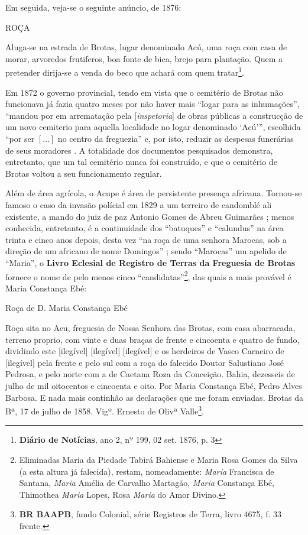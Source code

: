 Em seguida, veja-se o seguinte anúncio, de 1876:

\begin{citacao}
ROÇA

Aluga-se na estrada de Brotas, lugar denominado Acú, uma roça com casa de morar, arvoredos frutiferos, boa fonte de bica, brejo para plantação. Quem a pretender dirija-se a venda do beco que achará com quem tratar\footnote{\textbf{Diário de Notícias}, ano 2, nº 199, 02 set. 1876, p. 3}.
\end{citacao}

Em 1872 o governo provincial, tendo em vista que o cemitério de Brotas não funcionava já fazia quatro meses por não haver mais ``logar para as inhumações'', ``mandou por em arrematação pela [\textit{inspetoria}] de obras públicas a construcção de um novo cemiterio para aquella localidade no logar denominado `Acú''', escolhida ``por ser \([\dots]\) no centro da freguezia'' e, por isto, reduzir as despesas funerárias de seus moradores \cite[p.~12]{bahia_1872}. A totalidade dos documentos pesquisados demonstra, entretanto, que um tal cemitério nunca foi construído, e que o cemitério de Brotas voltou a seu funcionamento regular.

Além de área agrícola, o Acupe é área de persistente presença africana. Tornou-se famoso o caso da invasão polícial em 1829 a um terreiro de candomblé ali existente, a mando do juiz de paz Antonio Gomes de Abreu Guimarães \cite[pp.~32-61]{REISSILVA1989}; menos conhecida, entretanto, é a continuidade dos ``batuques'' e ``calundus'' na área trinta e cinco anos depois, desta vez ``na roça de uma senhora Marocas, sob a direção de um africano de nome Domingos'' \cite[p.~137]{reis_domingos_2008}; sendo ``Marocas'' um apelido de ``Maria'', o \textbf{Livro Eclesial de Registro de Terras da Freguesia de Brotas} fornece o nome de pelo menos cinco ``candidatas''\footnote{Eliminadas Maria da Piedade Tabirá Bahiense e Maria Rosa Gomes da Silva (a esta altura já falecida), restam, nomeadamente: \textit{Maria} Francisca de Santana, \textit{Maria} Amélia de Carvalho Martagão, \textit{Maria} Constança Ebé, Thimothea \textit{Maria} Lopes, Rosa \textit{Maria} do Amor Divino.}, das quais a mais provável é Maria Constança Ebé:

\begin{citacao}
Roça de D. Maria Constança Ebé

Roça sita no Acu, freguesia de Nossa Senhora das Brotas, com casa abarracada, terreno proprio, com vinte e duas braças de frente e cincoenta e quatro de fundo, dividindo este [ilegível] [ilegível] [ilegível] e os herdeiros de Vasco Carneiro de [ilegível] pela frente e pelo sul com a roça do falecido Doutor Salustiano José Pedrosa, e pelo norte com a de Caetana Roza da Conceição. Bahia, dezesseis de julho de mil oitocentos e cincoenta e oito. Por Maria Constança Ebé, Pedro Alves Barbosa. E nada mais continhão as declarações que me foram enviadas. Brotas da Bª, 17 de julho de 1858. Vigº. Ernesto de Olivª Valle\footnote{\textbf{BR BAAPB}, fundo Colonial, série Registros de Terra, livro 4675, f. 33 frente.}.
\end{citacao}


